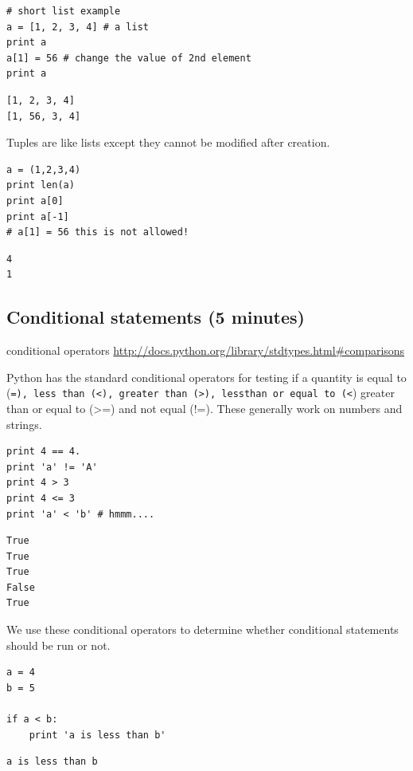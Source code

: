 \documentclass[11pt]{article}
\begin{document}
\begin{verbatim}
# short list example
a = [1, 2, 3, 4] # a list
print a
a[1] = 56 # change the value of 2nd element
print a
\end{verbatim}

\begin{verbatim}
[1, 2, 3, 4]
[1, 56, 3, 4]
\end{verbatim}

Tuples are like lists except they cannot be modified after creation.
\begin{verbatim}
a = (1,2,3,4)
print len(a)
print a[0]
print a[-1]
# a[1] = 56 this is not allowed!
\end{verbatim}

\begin{verbatim}
4
1

\end{verbatim}


\subsection{Conditional statements (5 minutes)}
\label{sec-3-4}
conditional operators \url{http://docs.python.org/library/stdtypes.html#comparisons}

Python has the standard conditional operators for testing if a quantity is equal to (\texttt{=), less than (<), greater than (>), lessthan or equal to (<}) greater than or equal to (>=) and not equal (!=). These generally work on numbers and strings.

\begin{verbatim}
print 4 == 4.
print 'a' != 'A'
print 4 > 3
print 4 <= 3
print 'a' < 'b' # hmmm....
\end{verbatim}

\begin{verbatim}
True
True
True
False
True
\end{verbatim}

We use these conditional operators to determine whether conditional statements should be run or not.

\begin{verbatim}
a = 4
b = 5

if a < b:
    print 'a is less than b'
\end{verbatim}

\begin{verbatim}
a is less than b
\end{verbatim}
\end{document}

